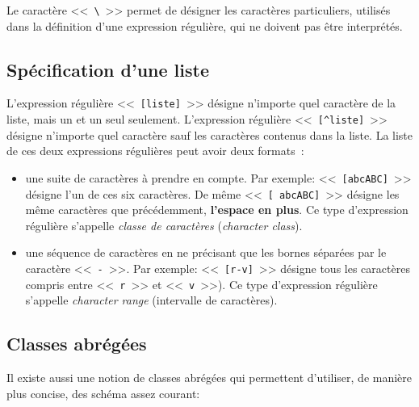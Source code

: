 Le caract{\`e}re <<~\verb=\=~>> permet de d{\'e}signer les caract{\`e}res
particuliers, utilis{\'e}s dans la d{\'e}finition d'une expression r{\'e}guli{\`e}re,
qui ne doivent pas {\^e}tre interpr{\'e}t{\'e}s.

%
%

\subsection{Sp{\'e}cification d'une liste}

L'expression r{\'e}guli{\`e}re <<~\verb=[liste]=~>> d{\'e}signe n'importe quel
caract{\`e}re de la liste, mais un et un seul seulement. L'expression
r{\'e}guli{\`e}re <<~\verb=[^liste]=~>> d{\'e}signe n'importe quel caract{\`e}re sauf les
caract{\`e}res contenus dans la liste. La liste de ces deux expressions
r{\'e}guli{\`e}res peut avoir deux formats~:
\begin{itemize}
	\item	une suite de caract{\`e}res {\`a} prendre en compte. Par exemple:
			<<~\verb=[abcABC]=~>> d{\'e}signe l'un de ces six caract{\`e}res. De m{\^e}me
			<<~\verb*=[ abcABC]=~>> d{\'e}signe les m{\^e}me caract{\`e}res que pr{\'e}c{\'e}demment,
			\textbf{l'espace en plus}. Ce type d'expression r{\'e}guli{\`e}re s'appelle
			 \textsl{classe de caract{\`e}res} (\textsl{character class}).
	\item	une s{\'e}quence de caract{\`e}res en ne pr{\'e}cisant que les bornes s{\'e}par{\'e}es par
			le caract{\`e}re <<~\texttt{-}~>>. Par exemple: <<~\verb=[r-v]=~>> d{\'e}signe
			tous les caract{\`e}res compris entre <<~\texttt{r}~>> et <<~\texttt{v}~>>).
			Ce type d'expression r{\'e}guli{\`e}re s'appelle \textsl{character range}
			(intervalle de caract{\`e}res).
\end{itemize}

%
%

\subsection{Classes abr{\'e}g{\'e}es}

Il existe aussi une notion de classes abr{\'e}g{\'e}es qui permettent d'utiliser, de mani{\`e}re 
plus concise, des sch{\'e}ma assez courant:

